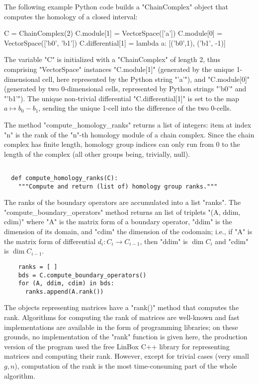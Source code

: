 The following example Python code builds a "ChainComplex" object that
computes the homology of a closed interval:
\begin{codexmp}
  C = ChainComplex(2)
  C.module[1] = VectorSpace(['a'])
  C.module[0] = VectorSpace(['b0', 'b1'])
  C.differential[1] = lambda a: [('b0',1), ('b1', -1)]
\end{codexmp}
The variable "C" is initialized with a "ChainComplex" of length 2,
thus comprising "VectorSpace" instances "C.module[1]" (generated by
the unique 1-dimensional cell, here represented by the Python string
"'a'"), and "C.module[0]" (generated by two 0-dimensional cells,
represented by Python strings "'b0'" and "'b1'").  The unique
non-trivial differential "C.differential[1]" is set to the map $a
\mapsto b_0 - b_1$, sending the unique 1-cell into the difference of
the two 0-cells.


The method "compute_homology_ranks" returns a list of integers: item
at index "n" is the rank of the "n"-th homology module of a chain
complex.  Since the chain complex has finite length, homology group
indices can only run from 0 to the length of the complex (all other
groups being, trivially, null).
\begin{lstlisting}

  def compute_homology_ranks(C):
    """Compute and return (list of) homology group ranks."""

\end{lstlisting}
The ranks of the boundary operators are accumulated into a list
"ranks".  The "compute_boundary_operators" method returns an list of
triplets "(A, ddim, cdim)" where "A" is the matrix form of a boundary
operator, "ddim" is the dimension of its domain, and "cdim" the
dimension of the codomain; i.e., if "A" is the matrix form of
differential $d_i: C_i \to C_{i-1}$, then "ddim" is $\dim C_i$ and
"cdim" is $\dim C_{i-1}$.
\begin{lstlisting}
    ranks = [ ]
    bds = C.compute_boundary_operators()
    for (A, ddim, cdim) in bds:
      ranks.append(A.rank())

\end{lstlisting}
The objects representing matrices have a "rank()" method that computes
the rank.  Algorithms for computing the rank of matrices are
well-known and fast implementations are available in
the form of programming libraries; on these grounds, no implementation
of the "rank" function is given here, the production version of the
program used the free LinBox C++ library
for representing matrices and computing their rank. However, except
for trivial cases (very small $g,n$), computation of the rank is the
most time-consuming part of the whole algorithm.

